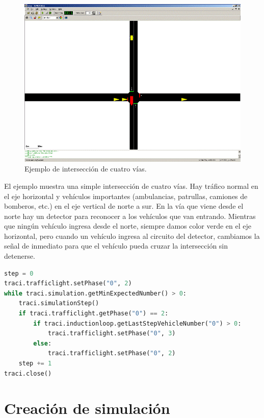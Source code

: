 \begin{figure}[H]
    \centering
\includegraphics[width=\textwidth]{sumo/3a9d001be95c93c93c1c13ed9aeb7b26.png}
    \caption{Ejemplo de intersección de cuatro vías.}
    \label{fig:sumogui3}
\end{figure}

El ejemplo muestra una simple intersección de cuatro vías. Hay tráfico
normal en el eje horizontal y vehículos importantes (ambulancias,
patrullas, camiones de bomberos, etc.) en el eje vertical de norte a
sur. En la vía que viene desde el norte hay un detector para reconocer a
los vehículos que van entrando. Mientras que ningún vehículo ingresa
desde el norte, siempre damos color verde en el eje horizontal, pero
cuando un vehículo ingresa al circuito del detector, cambiamos la señal
de inmediato para que el vehículo pueda cruzar la intersección sin
detenerse.

\begin{lstlisting}[language=Python]
step = 0
traci.trafficlight.setPhase("0", 2)
while traci.simulation.getMinExpectedNumber() > 0:
    traci.simulationStep()
    if traci.trafficlight.getPhase("0") == 2:
        if traci.inductionloop.getLastStepVehicleNumber("0") > 0:
            traci.trafficlight.setPhase("0", 3)
        else:
            traci.trafficlight.setPhase("0", 2)
    step += 1
traci.close()
\end{lstlisting}

\hypertarget{creaciuxf3n-de-simulaciuxf3n}{%
\section{Creación de simulación}\label{creaciuxf3n-de-simulaciuxf3n}}

